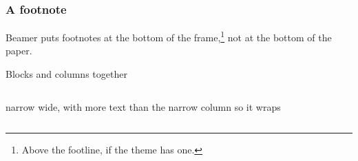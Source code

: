 \documentclass{beamer}
\begin{document}
\begin{frame}
  \frametitle{A footnote}
  Beamer puts footnotes at the bottom of the frame,\footnote{Above the
  footline, if the theme has one.} not at the bottom of the paper.

  \begin{block}{Blocks and columns together}
    \begin{columns}
        narrow
        wide, with more text than the narrow column so it wraps
    \end{columns}
  \end{block}
\end{frame}
\end{document}
